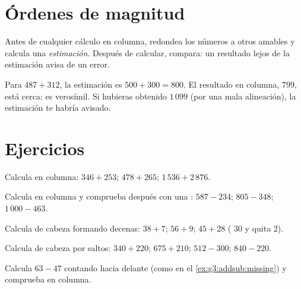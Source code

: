 \section{Órdenes de magnitud}

\begin{method}\label{met:g3:addsub:estimate}
Antes de cualquier cálculo en columna, redondea los números a otros amables y
calcula una \emph{estimación}. Después de calcular, compara: un resultado lejos
de la estimación avisa de un error.
\end{method}

\begin{example}
Para $487 + 312$, la estimación es $500 + 300 = 800$. El resultado en
columna, $799$, está cerca: es verosímil. Si hubieras obtenido $1\,099$
(por una mala alineación), la estimación te habría avisado.
\end{example}

\section{Ejercicios}

\begin{exercise}[$\star$]\label{exo:g3:addsub:1}
Calcula en columna: $346 + 253$; \quad $478 + 265$; \quad
$1\,536 + 2\,876$.
\end{exercise}

\begin{exercise}[$\star$]\label{exo:g3:addsub:2}
Calcula en columna y comprueba después con una : $587 - 234$; \quad
$805 - 348$; \quad $1\,000 - 463$.
\end{exercise}

\begin{exercise}[$\star$]\label{exo:g3:addsub:3}
Calcula de cabeza formando decenas: $38 + 7$; \quad $56 + 9$; \quad
$45 + 28$ ( $30$ y quita $2$).
\end{exercise}

\begin{exercise}[$\star$]\label{exo:g3:addsub:4}
Calcula de cabeza por saltos: $340 + 220$; \quad $675 + 210$; \quad
$512 - 300$; \quad $840 - 220$.
\end{exercise}

\begin{exercise}[$\star$]\label{exo:g3:addsub:5}
Calcula $63 - 47$ contando hacia delante (como en el
\cref{ex:g3:addsub:missing}) y comprueba en columna.
\end{exercise}

